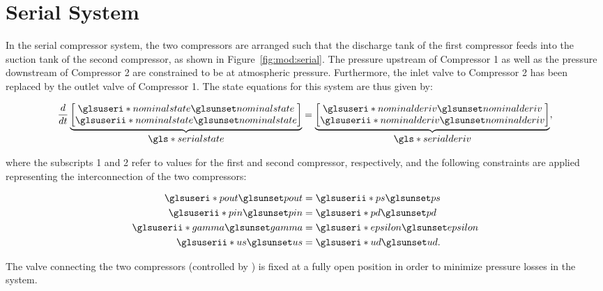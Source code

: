 \section{Serial System}
\label{sec:mod:serial}

In the serial compressor system, the two compressors are arranged such that the discharge tank of the first compressor feeds into the suction tank of the second compressor, as shown in Figure~\ref{fig:mod:serial}.
The pressure upstream of Compressor 1 as well as the pressure downstream of Compressor 2 are constrained to be at atmospheric pressure.
Furthermore, the inlet valve to Compressor 2 has been replaced by the outlet valve of Compressor 1. The state equations for this system are thus given by:

\begin{equation}
  \dt{}
  \ubrace{\begin{bmatrix}
    \gi{nominalstate}\\
    \gii{nominalstate}\\
  \end{bmatrix}}{\g{serialstate}} =
  \ubrace{\begin{bmatrix}
    \gi{nominalderiv}\\
    \gii{nominalderiv}
  \end{bmatrix}}{\g{serialderiv}},
  \label{eq:mod:serial-state-eq}
\end{equation}

\noindent where the subscripts 1 and 2 refer to values for the first and second compressor, respectively, and the following constraints are applied representing the interconnection of the two compressors:

\begin{equation}
  \begin{split}
    \gi{pout} & = \gii{ps}\\
    \gii{pin} & = \gi{pd}\\
    \gii{gamma} & = \gi{epsilon}\\
    \gii{us} & = \gi{ud}.
  \end{split}
  \label{eq:mod:serial-constraints}
\end{equation}

The valve connecting the two compressors (controlled by ) is fixed at a fully open position in order to minimize pressure losses in the system.


